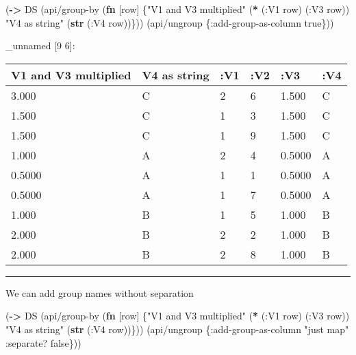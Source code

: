 \documentclass[]{article}
\newenvironment{Shaded}{\begin{snugshade}}{\end{snugshade}}
\newcommand{\KeywordTok}[1]{\textcolor[rgb]{0.13,0.29,0.53}{\textbf{#1}}}
\newcommand{\StringTok}[1]{\textcolor[rgb]{0.31,0.60,0.02}{#1}}
\newcommand{\VariableTok}[1]{\textcolor[rgb]{0.00,0.00,0.00}{#1}}
\newcommand{\AttributeTok}[1]{\textcolor[rgb]{0.77,0.63,0.00}{#1}}
\newcommand{\NormalTok}[1]{#1}
\begin{document}
\begin{Shaded}
\begin{Highlighting}[]
\NormalTok{(}\KeywordTok{->}\NormalTok{ DS}
\NormalTok{    (api/group-by (}\KeywordTok{fn}\NormalTok{ [row] \{}\StringTok{"V1 and V3 multiplied"}\NormalTok{ (}\KeywordTok{*}\NormalTok{ (}\AttributeTok{:V1}\NormalTok{ row)}
\NormalTok{                                                      (}\AttributeTok{:V3}\NormalTok{ row))}
                            \StringTok{"V4 as string"}\NormalTok{ (}\KeywordTok{str}\NormalTok{ (}\AttributeTok{:V4}\NormalTok{ row))\}))}
\NormalTok{    (api/ungroup \{}\AttributeTok{:add-group-as-column} \VariableTok{true}\NormalTok{\}))}
\end{Highlighting}
\end{Shaded}

\_unnamed {[}9 6{]}:

\begin{longtable}[]{@{}llllll@{}}
\toprule
V1 and V3 multiplied & V4 as string & :V1 & :V2 & :V3 &
:V4\tabularnewline
\midrule
\endhead
3.000 & C & 2 & 6 & 1.500 & C\tabularnewline
1.500 & C & 1 & 3 & 1.500 & C\tabularnewline
1.500 & C & 1 & 9 & 1.500 & C\tabularnewline
1.000 & A & 2 & 4 & 0.5000 & A\tabularnewline
0.5000 & A & 1 & 1 & 0.5000 & A\tabularnewline
0.5000 & A & 1 & 7 & 0.5000 & A\tabularnewline
1.000 & B & 1 & 5 & 1.000 & B\tabularnewline
2.000 & B & 2 & 2 & 1.000 & B\tabularnewline
2.000 & B & 2 & 8 & 1.000 & B\tabularnewline
\bottomrule
\end{longtable}

\begin{center}\rule{0.5\linewidth}{0.5pt}\end{center}

We can add group names without separation

\begin{Shaded}
\begin{Highlighting}[]
\NormalTok{(}\KeywordTok{->}\NormalTok{ DS}
\NormalTok{    (api/group-by (}\KeywordTok{fn}\NormalTok{ [row] \{}\StringTok{"V1 and V3 multiplied"}\NormalTok{ (}\KeywordTok{*}\NormalTok{ (}\AttributeTok{:V1}\NormalTok{ row)}
\NormalTok{                                                      (}\AttributeTok{:V3}\NormalTok{ row))}
                            \StringTok{"V4 as string"}\NormalTok{ (}\KeywordTok{str}\NormalTok{ (}\AttributeTok{:V4}\NormalTok{ row))\}))}
\NormalTok{    (api/ungroup \{}\AttributeTok{:add-group-as-column} \StringTok{"just map"}
                  \AttributeTok{:separate}\NormalTok{? }\VariableTok{false}\NormalTok{\}))}
\end{Highlighting}
\end{Shaded}
\end{document}
